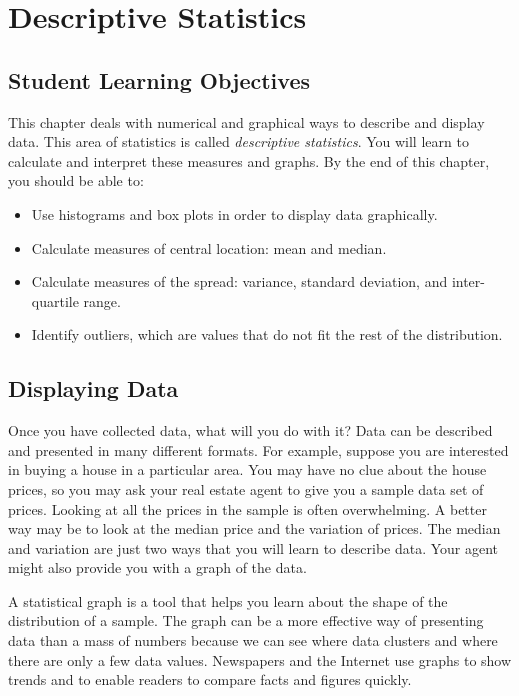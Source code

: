 \documentclass[]{krantz}
\providecommand{\tightlist}{%
  \setlength{\itemsep}{0pt}\setlength{\parskip}{0pt}}
\theoremstyle{definition}
\theoremstyle{definition}
\theoremstyle{definition}
\theoremstyle{remark}
\begin{document}
\hypertarget{ChapDescriptiveStat}{%
\chapter{Descriptive Statistics}\label{ChapDescriptiveStat}}

\hypertarget{student-learning-objectives-2}{%
\section{Student Learning Objectives}\label{student-learning-objectives-2}}

This chapter deals with numerical and graphical ways to describe and
display data. This area of statistics is called \emph{descriptive
statistics}. You will learn to calculate and interpret these measures
and graphs. By the end of this chapter, you should be able to:

\begin{itemize}
\tightlist
\item
  Use histograms and box plots in order to display data graphically.
\item
  Calculate measures of central location: mean and median.
\item
  Calculate measures of the spread: variance, standard deviation, and
  inter-quartile range.
\item
  Identify outliers, which are values that do not fit the rest of the
  distribution.
\end{itemize}

\hypertarget{displaying-data}{%
\section{Displaying Data}\label{displaying-data}}

Once you have collected data, what will you do with it? Data can be
described and presented in many different formats. For example, suppose
you are interested in buying a house in a particular area. You may have
no clue about the house prices, so you may ask your real estate agent to
give you a sample data set of prices. Looking at all the prices in the
sample is often overwhelming. A better way may be to look at the median
price and the variation of prices. The median and variation are just two
ways that you will learn to describe data. Your agent might also provide
you with a graph of the data.

A statistical graph is a tool that helps you learn about the shape of
the distribution of a sample. The graph can be a more effective way of
presenting data than a mass of numbers because we can see where data
clusters and where there are only a few data values. Newspapers and the
Internet use graphs to show trends and to enable readers to compare
facts and figures quickly.
\end{document}
